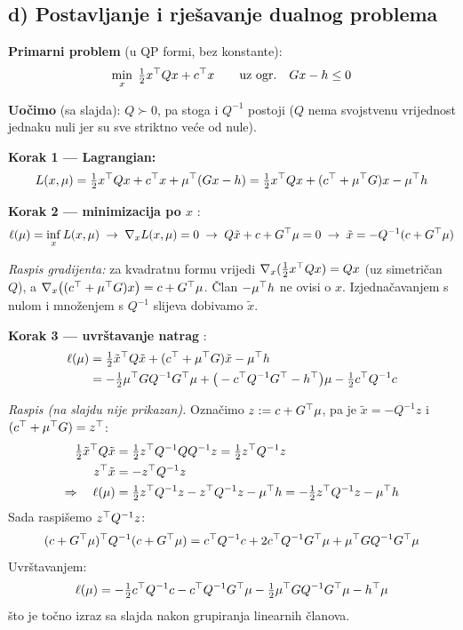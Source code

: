 \subsection{d) Postavljanje i rješavanje dualnog problema}

\textbf{Primarni problem} (u QP formi, bez konstante):
\[
\min_x \; \tfrac12 x^{\top} Qx + c^{\top} x \qquad\text{uz ogr.}\quad Gx - h \le 0
\]

\textbf{Uočimo} (sa slajda): $Q \succ 0$, pa stoga i $Q^{-1}$ postoji ($Q$ nema
svojstvenu vrijednost jednaku nuli jer su sve striktno veće od nule).

\textbf{Korak 1 --- Lagrangian:}
\[
L(x,\mu) = \tfrac12 x^{\top} Qx + c^{\top} x + \mu^{\top}(Gx - h)
         = \tfrac12 x^{\top} Qx + (c^{\top} + \mu^{\top} G)x - \mu^{\top} h
\]

\textbf{Korak 2 --- minimizacija po $x$} :
\[
\ell(\mu) = \inf_x L(x,\mu) \;\to\;
\nabla_x L(x,\mu) = 0 \;\to\;
Q\tilde x + c + G^{\top}\mu = 0 \;\to\;
\tilde x = -Q^{-1}(c + G^{\top}\mu)
\]

\emph{Raspis gradijenta:} za kvadratnu formu vrijedi
$\nabla_x(\tfrac12 x^{\top} Qx) = Qx$ (uz simetričan $Q$), a
$\nabla_x\big((c^{\top}+\mu^{\top} G)x\big) = c + G^{\top}\mu$. Član $-\mu^{\top} h$ ne ovisi o
$x$. Izjednačavanjem s nulom i množenjem s $Q^{-1}$ slijeva dobivamo $\tilde x$.
\checkmark

\textbf{Korak 3 --- uvrštavanje natrag} :
\begin{align}
\ell(\mu) &= \tfrac12\tilde x^{\top} Q\tilde x + (c^{\top} + \mu^{\top} G)\tilde x - \mu^{\top} h \\
&= -\tfrac12\mu^{\top} GQ^{-1}G^{\top}\mu
   + \big(-c^{\top} Q^{-1}G^{\top} - h^{\top}\big)\mu
   - \tfrac12 c^{\top} Q^{-1}c
\end{align}

\emph{Raspis (na slajdu nije prikazan).} Označimo $z := c + G^{\top}\mu$, pa je
$\tilde x = -Q^{-1}z$ i $(c^{\top}+\mu^{\top} G) = z^{\top}$:
\begin{align}
\tfrac12\tilde x^{\top} Q\tilde x
  &= \tfrac12 z^{\top} Q^{-1}QQ^{-1}z = \tfrac12 z^{\top} Q^{-1}z \\
z^{\top}\tilde x &= -z^{\top} Q^{-1}z \\
\Rightarrow\quad \ell(\mu)
  &= \tfrac12 z^{\top} Q^{-1}z - z^{\top} Q^{-1}z - \mu^{\top} h
   = -\tfrac12 z^{\top} Q^{-1}z - \mu^{\top} h
\end{align}
Sada raspišemo $z^{\top} Q^{-1}z$:
\[
(c + G^{\top}\mu)^{\top} Q^{-1}(c + G^{\top}\mu)
= c^{\top} Q^{-1}c + 2c^{\top} Q^{-1}G^{\top}\mu + \mu^{\top} GQ^{-1}G^{\top}\mu
\]
Uvrštavanjem:
\[
\ell(\mu) = -\tfrac12 c^{\top} Q^{-1}c - c^{\top} Q^{-1}G^{\top}\mu
            - \tfrac12\mu^{\top} GQ^{-1}G^{\top}\mu - h^{\top}\mu
\]
što je točno izraz sa slajda nakon grupiranja linearnih članova. \checkmark

